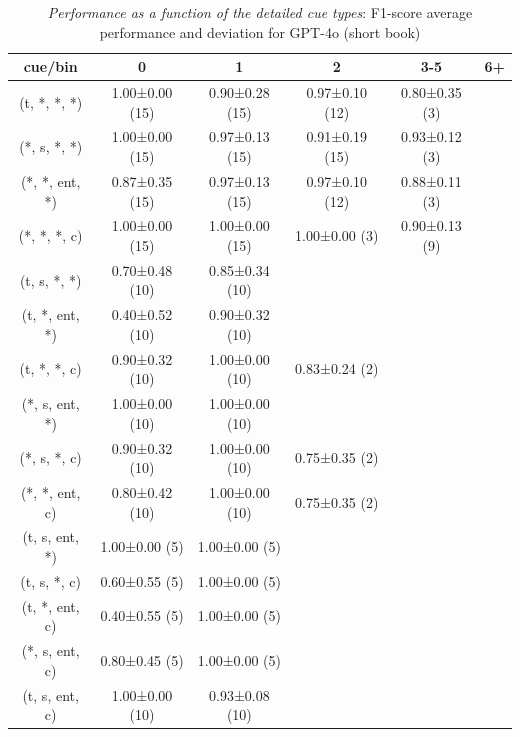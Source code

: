 \documentclass{article}
\begin{document}
\begin{table}[ht]
\centering
\caption{\textit{Performance as a function of the detailed cue types}: F1-score average performance and deviation for GPT-4o (short book)}
\label{tab:result_cue_bin_short}
\begin{tabular}{@{}cccccc@{}}
\toprule
cue/bin & \textbf{0} & \textbf{1} & \textbf{2} & \textbf{3-5} & \textbf{6+} \\ \midrule
(t, *, *, *) & 1.00±0.00 (15) & 0.90±0.28 (15) & 0.97±0.10 (12) & 0.80±0.35 (3) & \\
(*, s, *, *) & 1.00±0.00 (15) & 0.97±0.13 (15) & 0.91±0.19 (15) & 0.93±0.12 (3) & \\
(*, *, ent, *) & 0.87±0.35 (15) & 0.97±0.13 (15) & 0.97±0.10 (12) & 0.88±0.11 (3) & \\
(*, *, *, c) & 1.00±0.00 (15) & 1.00±0.00 (15) & 1.00±0.00 (3) & 0.90±0.13 (9) & \\

(t, s, *, *) & 0.70±0.48 (10) & 0.85±0.34 (10) &   &   & \\
(t, *, ent, *) & 0.40±0.52 (10) & 0.90±0.32 (10) &   &   & \\
(t, *, *, c) & 0.90±0.32 (10) & 1.00±0.00 (10) & 0.83±0.24 (2) &   & \\
(*, s, ent, *) & 1.00±0.00 (10) & 1.00±0.00 (10) &   &  & \\

(*, s, *, c) & 0.90±0.32 (10) & 1.00±0.00 (10) & 0.75±0.35 (2) &  & \\
(*, *, ent, c) & 0.80±0.42 (10) & 1.00±0.00 (10) & 0.75±0.35 (2) & & \\
(t, s, ent, *) & 1.00±0.00 (5) & 1.00±0.00 (5) &   &   & \\
(t, s, *, c) & 0.60±0.55 (5) & 1.00±0.00 (5) &   &   & \\
(t, *, ent, c) & 0.40±0.55 (5) & 1.00±0.00 (5) &   &   & \\
(*, s, ent, c) & 0.80±0.45 (5) & 1.00±0.00 (5) &   &   & \\
(t, s, ent, c) & 1.00±0.00 (10) & 0.93±0.08 (10) &   &   & \\ \bottomrule
\end{tabular}
\end{table}
\end{document}
